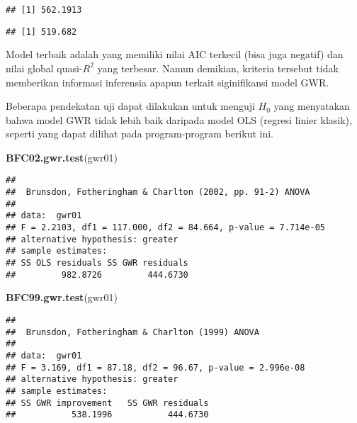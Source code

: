 \documentclass[
]{book}
\newenvironment{Shaded}{\begin{snugshade}}{\end{snugshade}}
\newcommand{\KeywordTok}[1]{\textcolor[rgb]{0.13,0.29,0.53}{\textbf{#1}}}
\newcommand{\NormalTok}[1]{#1}
\newcommand{\OperatorTok}[1]{\textcolor[rgb]{0.81,0.36,0.00}{\textbf{#1}}}
\begin{document}
\begin{verbatim}
## [1] 562.1913
\end{verbatim}

\begin{Shaded}
\end{Shaded}

\begin{verbatim}
## [1] 519.682
\end{verbatim}

Model terbaik adalah yang memiliki nilai AIC terkecil (bisa juga negatif) dan nilai global quasi-\(R^2\) yang terbesar. Namun demikian, kriteria tersebut tidak memberikan informasi inferensia apapun terkait siginifikansi model GWR.

Beberapa pendekatan uji dapat dilakukan untuk menguji \(H_0\) yang menyatakan bahwa model GWR tidak lebih baik daripada model OLS (regresi linier klasik), seperti yang dapat dilihat pada program-program berikut ini.

\begin{Shaded}
\begin{Highlighting}[]
\KeywordTok{BFC02.gwr.test}\NormalTok{(gwr01)}
\end{Highlighting}
\end{Shaded}

\begin{verbatim}
## 
##  Brunsdon, Fotheringham & Charlton (2002, pp. 91-2) ANOVA
## 
## data:  gwr01
## F = 2.2103, df1 = 117.000, df2 = 84.664, p-value = 7.714e-05
## alternative hypothesis: greater
## sample estimates:
## SS OLS residuals SS GWR residuals 
##         982.8726         444.6730
\end{verbatim}

\begin{Shaded}
\begin{Highlighting}[]
\KeywordTok{BFC99.gwr.test}\NormalTok{(gwr01)}
\end{Highlighting}
\end{Shaded}

\begin{verbatim}
## 
##  Brunsdon, Fotheringham & Charlton (1999) ANOVA
## 
## data:  gwr01
## F = 3.169, df1 = 87.18, df2 = 96.67, p-value = 2.996e-08
## alternative hypothesis: greater
## sample estimates:
## SS GWR improvement   SS GWR residuals 
##           538.1996           444.6730
\end{verbatim}
\end{document}
